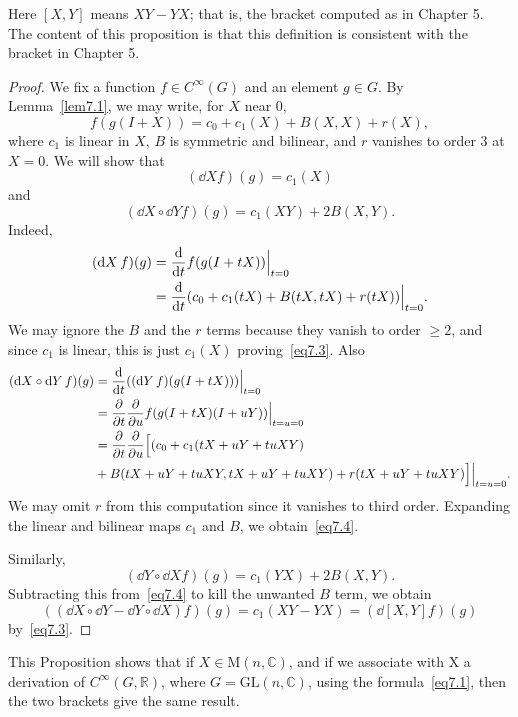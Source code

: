 \documentclass[12pt,reqno]{book}%
\theoremstyle{definition}
\theoremstyle{remark}
\theoremstyle{theorem}
\theoremstyle{remark}
\renewcommand{\d}{\dd}
\begin{document}
Here $[X, Y]$ means $XY - YX$; that is, the bracket computed as in Chapter 5.
The content of this proposition is that this definition is consistent with the bracket in Chapter 5.
\begin{proof}%
    We fix a function $f \in C^\infty(G)$ and an element $g \in G$.
    By Lemma~\ref{lem7.1}, we may write, for $X$ near 0,
    \[
        f(g(I + X)) = c_0 + c_1(X) + B(X, X) + r(X),
    \]
    where $c_1$ is linear in $X$, $B$ is symmetric and bilinear, and $r$ vanishes to order 3 at $X = 0$.
    We will show that
    \begin{equation}\label{eq7.3}
        (\d{X}f)(g) = c_1(X)
    \end{equation}
    and
    \begin{equation}\label{eq7.4}
        (\d{X} \circ \d{Y} f)(g) = c_1(XY) + 2B(X, Y).
    \end{equation}
    Indeed,
    \begin{align*}
        (\d{X}f)(g) &= \dv{t}f(g(I + tX)) \Big|_{t = 0} \\
        &= \dv{t}(c_0 + c_1(tX) + B(tX, tX) + r(tX))\Big|_{t = 0}.
    \end{align*}
    We may ignore the $B$ and the $r$ terms because they vanish to order $\geq 2$, and since $c_1$ is linear, this is just $c_1(X)$ proving~\eqref{eq7.3}.
    Also
    \begin{align*}
        (\d{X} \circ \d{Y}f)(g) &= \dv{t}((\d{Y}f)(g(I + tX)))\Big|_{t = 0} \\
        &= \pdv{t} \pdv{u} f(g(I + tX)(I + uY)) \Big|_{t = u = 0} \\
        &= \pdv{t} \pdv{u}\Big[(c_0 + c_1(tX + uY + tuXY) \\
        &+ B(tX + uY + tuXY, tX + uY + tuXY) + r(tX + uY + tuXY)\Big]\Big|_{t = u = 0}.
    \end{align*}
    We may omit $r$ from this computation since it vanishes to third order.
    Expanding the linear and bilinear maps $c_1$ and $B$, we obtain~\eqref{eq7.4}.

    Similarly,
    \[
        (\d{Y} \circ \d{X}f)(g) = c_1(YX) + 2B(X, Y).
    \]
    Subtracting this from~\eqref{eq7.4} to kill the unwanted $B$ term, we obtain
    \[
        ((\d{X} \circ \d{Y} - \d{Y} \circ \d{X})f)(g) = c_1(XY - YX) = (\d{[X, Y]}f)(g)
    \]
    by~\eqref{eq7.3}.
\end{proof}%

This Proposition shows that if $X \in \mathrm{M}(n, \mathbb{C})$, and if we associate with X a derivation of $C^\infty(G, \mathbb{R})$, where $G = \mathrm{GL}(n, \mathbb{C})$, using the formula~\eqref{eq7.1}, then the two brackets give the same result.
\end{document}
